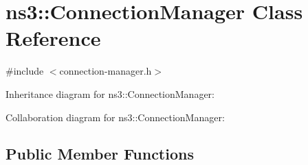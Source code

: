 \hypertarget{classns3_1_1ConnectionManager}{}\section{ns3\+:\+:Connection\+Manager Class Reference}
\label{classns3_1_1ConnectionManager}


{\ttfamily \#include $<$connection-\/manager.\+h$>$}



Inheritance diagram for ns3\+:\+:Connection\+Manager\+:


Collaboration diagram for ns3\+:\+:Connection\+Manager\+:
\subsection*{Public Member Functions}
